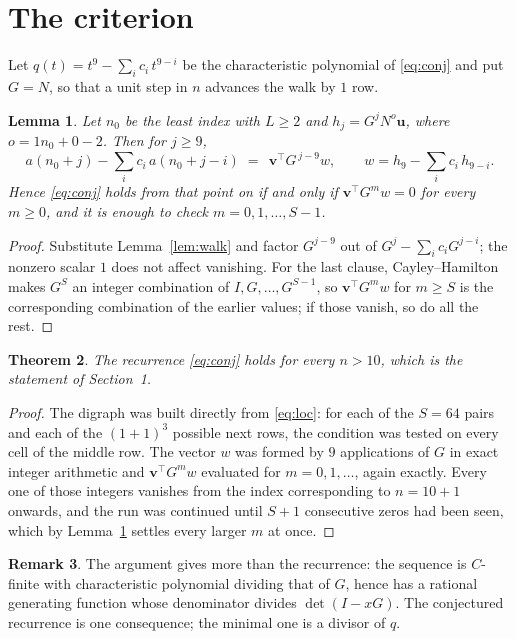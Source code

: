 \documentclass[11pt,a4paper]{article}
\theoremstyle{plain}
\newtheorem{theorem}{Theorem}
\newtheorem{lemma}[theorem]{Lemma}
\theoremstyle{definition}
\newtheorem{remark}[theorem]{Remark}
\begin{document}
\section{The criterion}

Let $q(t)=t^{9}-\sum_i c_i\,t^{9-i}$ be the characteristic polynomial of
\eqref{eq:conj} and put $G=N$, so that a unit step in $n$ advances the walk by
$1$ row.

\begin{lemma}\label{lem:crit}
Let $n_0$ be the least index with $L\ge2$ and $h_j=G^{j}N^{o}\mathbf{u}$, where
$o=1n_0+0-2$. Then for $j\ge9$,
\[
a(n_0+j)-\sum_i c_i\,a(n_0+j-i)\;=\;\,\mathbf{v}^{\!\top}G^{\,j-9}w,
\qquad w=h_{9}-\sum_i c_i\,h_{9-i} .
\]
Hence \eqref{eq:conj} holds from that point on if and only if
$\mathbf{v}^{\!\top}G^{m}w=0$ for every $m\ge0$, and it is enough to check
$m=0,1,\dots,S-1$.
\end{lemma}

\begin{proof}
Substitute Lemma~\ref{lem:walk} and factor $G^{j-9}$ out of
$G^{j}-\sum_ic_iG^{j-i}$; the nonzero scalar $1$ does not affect
vanishing. For the last clause, Cayley--Hamilton makes $G^{S}$ an integer combination of
$I,G,\dots,G^{S-1}$, so $\mathbf{v}^{\!\top}G^{m}w$ for $m\ge S$ is the corresponding
combination of the earlier values; if those vanish, so do all the rest.
\end{proof}

\begin{theorem}
The recurrence \eqref{eq:conj} holds for every $n>10$, which is the statement of
Section~1.
\end{theorem}

\begin{proof}
The digraph was built directly from \eqref{eq:loc}: for each of the $S=64$ pairs and each
of the $(1+1)^{3}$ possible next rows, the condition was tested on every cell of
the middle row. The vector $w$ was formed by $9$ applications of $G$ in exact integer
arithmetic and $\mathbf{v}^{\!\top}G^{m}w$ evaluated for $m=0,1,\dots$, again exactly.
Every one of those integers vanishes from the index corresponding to $n=10+1$ onwards,
and the run was continued until $S+1$ consecutive zeros had been seen, which by
Lemma~\ref{lem:crit} settles every larger $m$ at once.
\end{proof}

\begin{remark}
The argument gives more than the recurrence: the sequence is $C$-finite with characteristic
polynomial dividing that of $G$, hence has a rational generating function whose denominator
divides $\det(I-xG)$. The conjectured recurrence is one consequence; the minimal one is a
divisor of $q$.
\end{remark}
\end{document}
